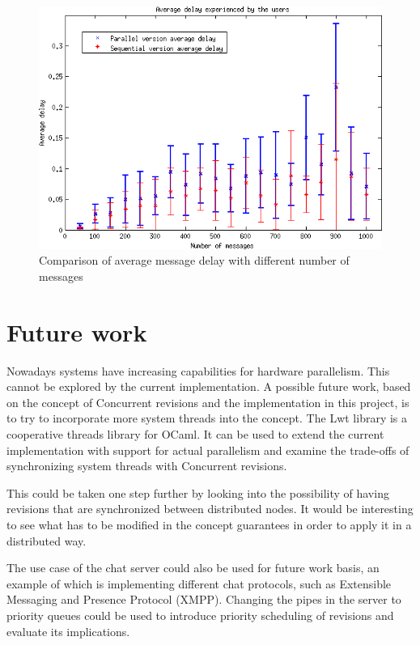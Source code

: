 \documentclass[12pt,twoside,notitlepage]{report}
\begin{document}
\begin{figure}[ht!]
\centering
\includegraphics[width=135mm]{plot_m_10.png}
\caption{Comparison of average message delay with different number of messages}
\label{test_2}
\end{figure} 

\section{Future work}
Nowadays systems have increasing capabilities for hardware parallelism. This cannot be explored by the current implementation. A possible future work, based on the concept of Concurrent revisions and the implementation in this project, is to try to incorporate more system threads into the concept. The Lwt library is a cooperative threads library for OCaml\cite{lwt}. It can be used to extend the current implementation with support for actual parallelism and examine the trade-offs of synchronizing system threads with Concurrent revisions.

This could be taken one step further by looking into the possibility of having revisions that are synchronized between distributed nodes. It would be interesting to see what has to be modified in the concept guarantees in order to apply it in a distributed way.

The use case of the chat server could also be used for future work basis, an example of which is implementing different chat protocols, such as Extensible Messaging and Presence Protocol (XMPP)\cite{xmpp}. Changing the pipes in the server to priority queues could be used to introduce priority scheduling of revisions and evaluate its implications.  
\end{document}
